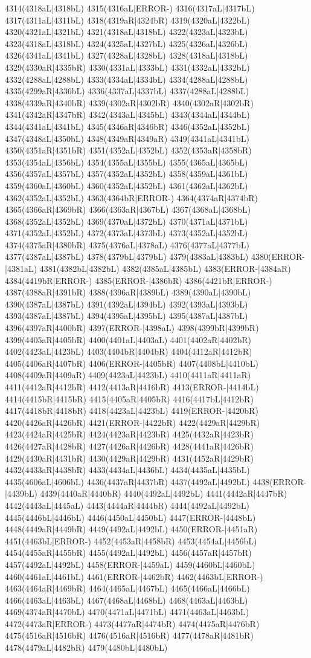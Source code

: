 4314(4318aL|4318bL) 4315(4316aL|ERROR-) 4316(4317aL|4317bL) 4317(4311aL|4311bL) 4318(4319aR|4324bR) 4319(4320aL|4322bL) 4320(4321aL|4321bL) 4321(4318aL|4318bL) 4322(4323aL|4323bL) 4323(4318aL|4318bL) 4324(4325aL|4327bL) 4325(4326aL|4326bL) 4326(4341aL|4341bL) 4327(4328aL|4328bL) 4328(4318aL|4318bL) 4329(4330aR|4335bR) 4330(4331aL|4333bL) 4331(4332aL|4332bL) 4332(4288aL|4288bL) 4333(4334aL|4334bL) 4334(4288aL|4288bL) 4335(4299aR|4336bL) 4336(4337aL|4337bL) 4337(4288aL|4288bL) 4338(4339aR|4340bR) 4339(4302aR|4302bR) 4340(4302aR|4302bR) 4341(4342aR|4347bR) 4342(4343aL|4345bL) 4343(4344aL|4344bL) 4344(4341aL|4341bL) 4345(4346aR|4346bR) 4346(4352aL|4352bL) 4347(4348aL|4350bL) 4348(4349aR|4349aR) 4349(4341aL|4341bL) 4350(4351aR|4351bR) 4351(4352aL|4352bL) 4352(4353aR|4358bR) 4353(4354aL|4356bL) 4354(4355aL|4355bL) 4355(4365aL|4365bL) 4356(4357aL|4357bL) 4357(4352aL|4352bL) 4358(4359aL|4361bL) 4359(4360aL|4360bL) 4360(4352aL|4352bL) 4361(4362aL|4362bL) 4362(4352aL|4352bL) 4363(4364bR|ERROR-) 4364(4374aR|4374bR) 4365(4366aR|4369bR) 4366(4363aR|4367bL) 4367(4368aL|4368bL) 4368(4352aL|4352bL) 4369(4370aL|4372bL) 4370(4371aL|4371bL) 4371(4352aL|4352bL) 4372(4373aL|4373bL) 4373(4352aL|4352bL) 4374(4375aR|4380bR) 4375(4376aL|4378aL) 4376(4377aL|4377bL) 4377(4387aL|4387bL) 4378(4379bL|4379bL) 4379(4383aL|4383bL) 4380(ERROR-|4381aL) 4381(4382bL|4382bL) 4382(4385aL|4385bL) 4383(ERROR-|4384aR) 4384(4419bR|ERROR-) 4385(ERROR-|4386bR) 4386(4421bR|ERROR-) 4387(4388aR|4391bR) 4388(4396aR|4389bL) 4389(4390aL|4390bL) 4390(4387aL|4387bL) 4391(4392aL|4394bL) 4392(4393aL|4393bL) 4393(4387aL|4387bL) 4394(4395aL|4395bL) 4395(4387aL|4387bL) 4396(4397aR|4400bR) 4397(ERROR-|4398aL) 4398(4399bR|4399bR) 4399(4405aR|4405bR) 4400(4401aL|4403aL) 4401(4402aR|4402bR) 4402(4423aL|4423bL) 4403(4404bR|4404bR) 4404(4412aR|4412bR) 4405(4406aR|4407bR) 4406(ERROR-|4405bR) 4407(4408bL|4410bL) 4408(4409aR|4409aR) 4409(4423aL|4423bL) 4410(4411aR|4411aR) 4411(4412aR|4412bR) 4412(4413aR|4416bR) 4413(ERROR-|4414bL) 4414(4415bR|4415bR) 4415(4405aR|4405bR) 4416(4417bL|4412bR) 4417(4418bR|4418bR) 4418(4423aL|4423bL) 4419(ERROR-|4420bR) 4420(4426aR|4426bR) 4421(ERROR-|4422bR) 4422(4429aR|4429bR) 4423(4424aR|4425bR) 4424(4423aR|4423bR) 4425(4432aR|4423bR) 4426(4427aR|4428bR) 4427(4426aR|4426bR) 4428(4441aR|4426bR) 4429(4430aR|4431bR) 4430(4429aR|4429bR) 4431(4452aR|4429bR) 4432(4433aR|4438bR) 4433(4434aL|4436bL) 4434(4435aL|4435bL) 4435(4606aL|4606bL) 4436(4437aR|4437bR) 4437(4492aL|4492bL) 4438(ERROR-|4439bL) 4439(4440aR|4440bR) 4440(4492aL|4492bL) 4441(4442aR|4447bR) 4442(4443aL|4445aL) 4443(4444aR|4444bR) 4444(4492aL|4492bL) 4445(4446bL|4446bL) 4446(4450aL|4450bL) 4447(ERROR-|4448bL) 4448(4449aR|4449bR) 4449(4492aL|4492bL) 4450(ERROR-|4451aR) 4451(4463bL|ERROR-) 4452(4453aR|4458bR) 4453(4454aL|4456bL) 4454(4455aR|4455bR) 4455(4492aL|4492bL) 4456(4457aR|4457bR) 4457(4492aL|4492bL) 4458(ERROR-|4459aL) 4459(4460bL|4460bL) 4460(4461aL|4461bL) 4461(ERROR-|4462bR) 4462(4463bL|ERROR-) 4463(4464aR|4469bR) 4464(4465aL|4467bL) 4465(4466aL|4466bL) 4466(4463aL|4463bL) 4467(4468aL|4468bL) 4468(4463aL|4463bL) 4469(4374aR|4470bL) 4470(4471aL|4471bL) 4471(4463aL|4463bL) 4472(4473aR|ERROR-) 4473(4477aR|4474bR) 4474(4475aR|4476bR) 4475(4516aR|4516bR) 4476(4516aR|4516bR) 4477(4478aR|4481bR) 4478(4479aL|4482bR) 4479(4480bL|4480bL) 